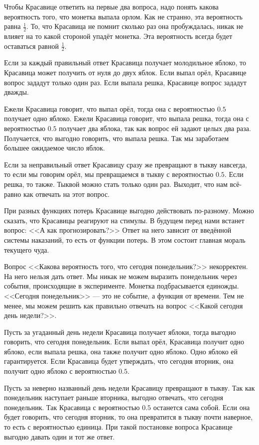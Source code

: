 \documentclass[12pt, a4paper, oneside]{extreport}
\theoremstyle{plain}              %
\theoremstyle{definition}         %
\begin{document}
Чтобы Красавице ответить на первые два вопроса, надо понять какова вероятность того, что монетка выпала орлом. Как не странно, эта вероятность равна $\frac{1}{2}$. То, что Красавица не помнит сколько раз она пробуждалась, никак не влияет на то какой стороной упадёт монетка. Эта вероятность всегда будет оставаться равной $\frac{1}{2}$.

Если за каждый правильный ответ Красавица получает молодильное яблоко, то Красавица может получить от нуля до двух яблок. Если выпал орёл, Красавице вопрос зададут только один раз. Если выпала решка, Красавице вопрос зададут дважды.

Ежели Красавица говорит, что выпал орёл, тогда она с вероятностью $0.5$ получает одно яблоко. Ежели Красавица говорит, что выпала решка, тогда она с вероятностью $0.5$ получает два яблока, так как вопрос ей задают целых два раза. Получается, что выгодно говорить, что выпала решка. Так мы заработаем большее ожидаемое число яблок.

Если за неправильный ответ Красавицу сразу же превращают в тыкву навсегда, то если мы говорим орёл, мы превращаемся в тыкву с вероятностью $0.5$. Если решка, то также. Тыквой можно стать только один раз. Выходит, что нам всё-равно как отвечать на этот вопрос.

При разных функциях потерь Красавице выгодно действовать по-разному. Можно сказать, что Красавицы реагируют на стимулы. В будущем перед нами встанет вопрос: <<А как прогнозировать?>> Ответ на него зависит от введённой системы наказаний, то есть от функции потерь. В этом состоит главная мораль текущего чуда. 

Вопрос <<Какова вероятность того, что сегодня понедельник?>> некорректен. На него нельзя дать ответ. Мы никак не можем выразить понедельник через события, происходящие в эксперименте. Монетка подбрасывается единожды. <<Сегодня понедельник>> --- это не событие, а функция от времени. Тем не менее, мы можем решить как правильно отвечать на вопрос <<Какой сегодня день недели?>>.

Пусть за угаданный день недели Красавица получает яблоки, тогда выгодно говорить, что сегодня понедельник. Если выпал орёл, Красавица получит одно яблоко, если выпала решка, она также получит одно яблоко. Одно яблоко ей гарантируется. Если Красавица будет утверждать, что сегодня вторник, она получит одно яблоко с вероятностью $0.5$.

Пусть за неверно названный день недели Красавицу превращают в тыкву. Так как понедельник наступает раньше вторника, выгодно отвечать, что сегодня понедельник. Так Красавица с вероятностью $0.5$ останется сама собой. Если она будет говорить, что сегодня вторник, то она превратится в тыкву почти наверное, то есть с вероятностью единица. При такой постановке вопроса Красавице выгодно давать один и тот же ответ.
\end{document}
